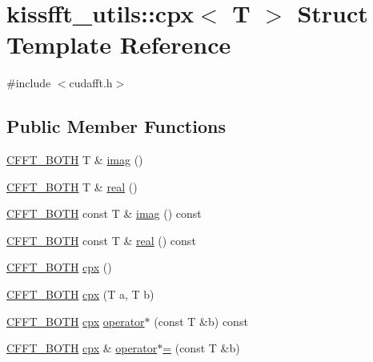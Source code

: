 \hypertarget{structkissfft__utils_1_1cpx}{}\section{kissfft\+\_\+utils\+:\+:cpx$<$ T $>$ Struct Template Reference}
\label{structkissfft__utils_1_1cpx}


{\ttfamily \#include $<$cudafft.\+h$>$}

\subsection*{Public Member Functions}
\begin{DoxyCompactItemize}
\item 
\hyperlink{cudafft_8h_ac4c6e1a008a73d82e1c532fd74830837}{C\+F\+F\+T\+\_\+\+B\+O\+TH} T \& \hyperlink{structkissfft__utils_1_1cpx_a0966708e67a63545caed48d77ae6616a}{imag} ()
\item 
\hyperlink{cudafft_8h_ac4c6e1a008a73d82e1c532fd74830837}{C\+F\+F\+T\+\_\+\+B\+O\+TH} T \& \hyperlink{structkissfft__utils_1_1cpx_a52e1f40cc4ae197949ebbeda432d87c4}{real} ()
\item 
\hyperlink{cudafft_8h_ac4c6e1a008a73d82e1c532fd74830837}{C\+F\+F\+T\+\_\+\+B\+O\+TH} const T \& \hyperlink{structkissfft__utils_1_1cpx_a131194540b0d5b24b28c959d785879c7}{imag} () const 
\item 
\hyperlink{cudafft_8h_ac4c6e1a008a73d82e1c532fd74830837}{C\+F\+F\+T\+\_\+\+B\+O\+TH} const T \& \hyperlink{structkissfft__utils_1_1cpx_a39f0eff7b98ebc7d7b5674da3db3dc63}{real} () const 
\item 
\hyperlink{cudafft_8h_ac4c6e1a008a73d82e1c532fd74830837}{C\+F\+F\+T\+\_\+\+B\+O\+TH} \hyperlink{structkissfft__utils_1_1cpx_af5e3e4d749b09cdc1a4e7577f0a4967c}{cpx} ()
\item 
\hyperlink{cudafft_8h_ac4c6e1a008a73d82e1c532fd74830837}{C\+F\+F\+T\+\_\+\+B\+O\+TH} \hyperlink{structkissfft__utils_1_1cpx_aa6a1c29bb3ac54964dee4ac399d0d8d5}{cpx} (T a, T b)
\item 
\hyperlink{cudafft_8h_ac4c6e1a008a73d82e1c532fd74830837}{C\+F\+F\+T\+\_\+\+B\+O\+TH} \hyperlink{structkissfft__utils_1_1cpx}{cpx} \hyperlink{structkissfft__utils_1_1cpx_a1c3f5b9e1a53886683d752ec69fb2bc6}{operator$\ast$} (const T \&b) const 
\item 
\hyperlink{cudafft_8h_ac4c6e1a008a73d82e1c532fd74830837}{C\+F\+F\+T\+\_\+\+B\+O\+TH} \hyperlink{structkissfft__utils_1_1cpx}{cpx} \& \hyperlink{structkissfft__utils_1_1cpx_a867b8554be4bcc6c429d1f241c40cc23}{operator$\ast$=} (const T \&b)

\end{DoxyCompactItemize}

